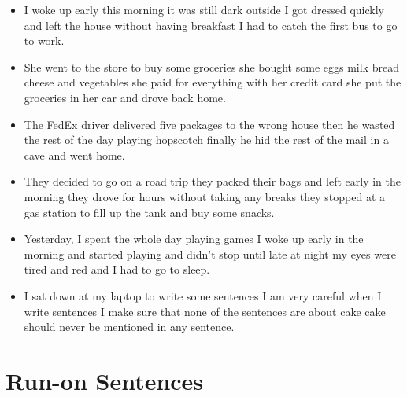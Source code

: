 \documentclass[letterpaper, 17pt]{article}
\begin{document}
\begin{itemize}
	\item I woke up early this morning it was still dark outside I got dressed quickly and left the house without having breakfast I had to catch the first bus to go to work.	%
	\item She went to the store to buy some groceries she bought some eggs milk bread cheese and vegetables she paid for everything with her credit card she put the groceries in her car and drove back home.	%
	\item The FedEx driver delivered five packages to the wrong house then he wasted the rest of the day playing hopscotch finally he hid the rest of the mail in a cave and went home.	%
	\item They decided to go on a road trip they packed their bags and left early in the morning they drove for hours without taking any breaks they stopped at a gas station to fill up the tank and buy some snacks.	%
	\item Yesterday, I spent the whole day playing games I woke up early in the morning and started playing and didn't stop until late at night my eyes were tired and red and I had to go to sleep.	%
	\item I sat down at my laptop to write some sentences I am very careful when I write sentences I make sure that none of the sentences are about cake cake should never be mentioned in any sentence.	%
\end{itemize}

\newpage
\section*{Run-on Sentences}
\end{document}
